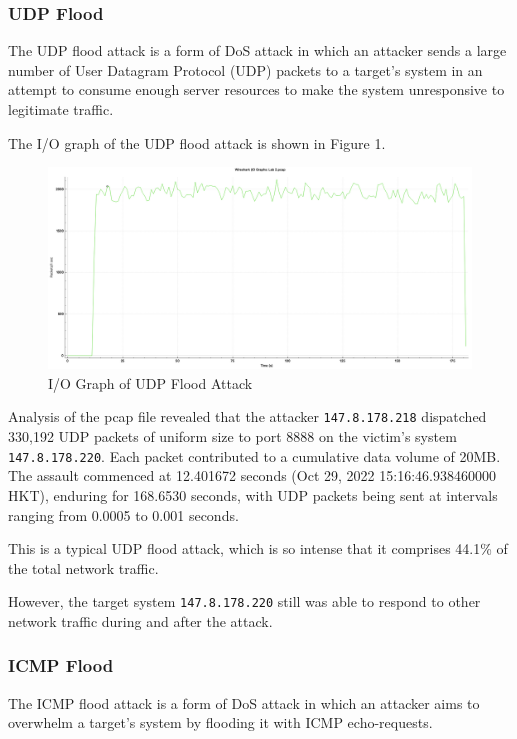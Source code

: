 \documentclass{article}
\begin{document}
    \subsubsection{UDP Flood}\label{subsubsec:udp-flood}
    The UDP flood attack is a form of DoS attack in which an attacker sends a large number of User Datagram Protocol (UDP) packets to a target's system in an attempt to consume enough server resources to make the system unresponsive to legitimate traffic.

    The I/O graph of the UDP flood attack is shown in Figure 1.

    \begin{figure}[H]
        \centering
        \includegraphics[width=\textwidth]{image/218_udp.png}
        \caption{I/O Graph of UDP Flood Attack}
        \label{fig:udp-flood-io-graph}
    \end{figure}

    Analysis of the pcap file revealed that the attacker \lstinline|147.8.178.218| dispatched 330,192 UDP packets of uniform size to port 8888 on the victim's system \lstinline|147.8.178.220|. 
    Each packet contributed to a cumulative data volume of 20MB.
    The assault commenced at 12.401672 seconds (Oct 29, 2022 15:16:46.938460000 HKT), enduring for 168.6530 seconds, with UDP packets being sent at intervals ranging from 0.0005 to 0.001 seconds.

    This is a typical UDP flood attack, which is so intense that it comprises 44.1\% of the total network traffic.
    
    However, the target system \lstinline|147.8.178.220| still was able to respond to other network traffic during and after the attack.

    \subsubsection{ICMP Flood}\label{subsubsec:icmp-flood}
    The ICMP flood attack is a form of DoS attack in which an attacker aims to overwhelm a target's system by flooding it with ICMP echo-requests.
\end{document}
